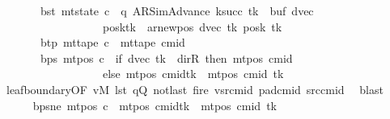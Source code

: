 \begin{isabellebody}
\ \ \ \ \ \ \ bst{\isacharcolon}{\kern0pt}\ {\isachardoublequoteopen}mt{\isacharunderscore}{\kern0pt}state\ c{\isacharprime}{\kern0pt}\ {\isacharequal}{\kern0pt}\ {\isacharparenleft}{\kern0pt}q{\isacharcomma}{\kern0pt}\ AR{\isacharunderscore}{\kern0pt}SimAdvance{\isacharcomma}{\kern0pt}\ k{\isacharunderscore}{\kern0pt}succ\ tk{\isacharcomma}{\kern0pt}\ {}{\isacharcomma}{\kern0pt}\ buf{\isacharcomma}{\kern0pt}\ dvec{\isacharcomma}{\kern0pt}\isanewline
\ \ \ \ \ \ \ \ \ \ \ \ \ \ \ \ \ \ posk{\isacharparenleft}{\kern0pt}tk\ {\isacharcolon}{\kern0pt}{\isacharequal}{\kern0pt}\ ar{\isacharunderscore}{\kern0pt}newpos\ {\isacharparenleft}{\kern0pt}dvec\ tk{\isacharparenright}{\kern0pt}\ {\isacharparenleft}{\kern0pt}posk\ tk{\isacharparenright}{\kern0pt}{\isacharparenright}{\kern0pt}{\isacharparenright}{\kern0pt}{\isachardoublequoteclose}\isanewline
\ \ \ \ \ \ \ btp{\isacharcolon}{\kern0pt}\ {\isachardoublequoteopen}mt{\isacharunderscore}{\kern0pt}tape\ c{\isacharprime}{\kern0pt}\ {\isacharequal}{\kern0pt}\ mt{\isacharunderscore}{\kern0pt}tape\ cmid{\isachardoublequoteclose}\isanewline
\ \ \ \ \ \ \ bps{\isacharcolon}{\kern0pt}\ {\isachardoublequoteopen}mt{\isacharunderscore}{\kern0pt}pos\ c{\isacharprime}{\kern0pt}\ {\isacharequal}{\kern0pt}\ {\isacharparenleft}{\kern0pt}if\ dvec\ tk\ {\isacharequal}{\kern0pt}\ dir{\isachardot}{\kern0pt}R\ then\ mt{\isacharunderscore}{\kern0pt}pos\ cmid\isanewline
\ \ \ \ \ \ \ \ \ \ \ \ \ \ \ \ \ \ else\ {\isacharparenleft}{\kern0pt}mt{\isacharunderscore}{\kern0pt}pos\ cmid{\isacharparenright}{\kern0pt}{\isacharparenleft}{\kern0pt}tk\ {\isacharcolon}{\kern0pt}{\isacharequal}{\kern0pt}\ mt{\isacharunderscore}{\kern0pt}pos\ cmid\ tk\ {\isacharminus}{\kern0pt}\ {}{\isacharparenright}{\kern0pt}{\isacharparenright}{\kern0pt}{\isachardoublequoteclose}\isanewline
\ \ \ \ \ \ \isamarkupfalse%
\ leaf{\isacharunderscore}{\kern0pt}boundary{\isacharbrackleft}{\kern0pt}OF\ vM\ lst\ qQ\ notlast\ fire\ vsrcmid\ pad{\isacharunderscore}{\kern0pt}cmid\ src{\isacharunderscore}{\kern0pt}cmid{\isacharbrackright}{\kern0pt}\ \isamarkupfalse%
\ blast\isanewline
\ \ \ \ \isamarkupfalse%
\ bps{\isacharunderscore}{\kern0pt}ne{\isacharcolon}{\kern0pt}\ {\isachardoublequoteopen}mt{\isacharunderscore}{\kern0pt}pos\ c{\isacharprime}{\kern0pt}\ {\isacharequal}{\kern0pt}\ {\isacharparenleft}{\kern0pt}mt{\isacharunderscore}{\kern0pt}pos\ cmid{\isacharparenright}{\kern0pt}{\isacharparenleft}{\kern0pt}tk\ {\isacharcolon}{\kern0pt}{\isacharequal}{\kern0pt}\ mt{\isacharunderscore}{\kern0pt}pos\ cmid\ tk\ {\isacharminus}{\kern0pt}\ {}{\isacharparenright}{\kern0pt}{\isachardoublequoteclose}\isanewline

\end{isabellebody}
